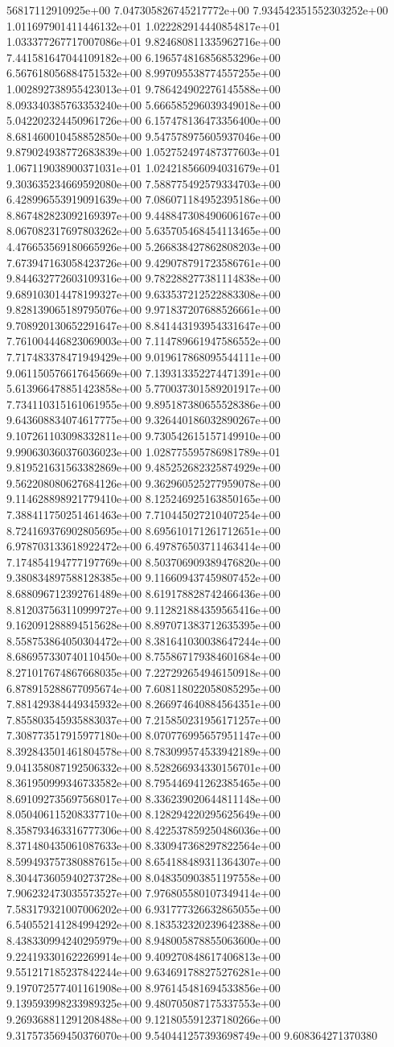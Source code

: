 56817112910925e+00	7.047305826745217772e+00	7.934542351552303252e+00	1.011697901411446132e+01	1.022282914440854817e+01	1.033377267717007086e+01	9.824680811335962716e+00	7.441581647044109182e+00	6.196574816856853296e+00	6.567618056884751532e+00	8.997095538774557255e+00	1.002892738955423013e+01	9.786424902276145588e+00	8.093340385763353240e+00	5.666585296039349018e+00	5.042202324450961726e+00	6.157478136473356400e+00	8.681460010458852850e+00	9.547578975605937046e+00	9.879024938772683839e+00	1.052752497487377603e+01	1.067119038900371031e+01	1.024218566094031679e+01	9.303635234669592080e+00	7.588775492579334703e+00	6.428996553919091639e+00	7.086071184952395186e+00	8.867482823092169397e+00	9.448847308490606167e+00	8.067082317697803262e+00	5.635705468454113465e+00	4.476653569180665926e+00	5.266838427862808203e+00	7.673947163058423726e+00	9.429078791723586761e+00	9.844632772603109316e+00	9.782288277381114838e+00	9.689103014478199327e+00	9.633537212522883308e+00	9.828139065189795076e+00	9.971837207688526661e+00	9.708920130652291647e+00	8.841443193954331647e+00	7.761004446823069003e+00	7.114789661947586552e+00	7.717483378471949429e+00	9.019617868095544111e+00	9.061150576617645669e+00	7.139313352274471391e+00	5.613966478851423858e+00	5.770037301589201917e+00	7.734110315161061955e+00	9.895187380655528386e+00	9.643608834074617775e+00	9.326440186032890267e+00	9.107261103098332811e+00	9.730542615157149910e+00	9.990630360376036023e+00	1.028775595786981789e+01	9.819521631563382869e+00	9.485252682325874929e+00	9.562208080627684126e+00	9.362960525277959078e+00	9.114628898921779410e+00	8.125246925163850165e+00	7.388411750251461463e+00	7.710445027210407254e+00	8.724169376902805695e+00	8.695610171261712651e+00	6.978703133618922472e+00	6.497876503711463414e+00	7.174854194777197769e+00	8.503706909389476820e+00	9.380834897588128385e+00	9.116609437459807452e+00	8.688096712392761489e+00	8.619178828742466436e+00	8.812037563110999727e+00	9.112821884359565416e+00	9.162091288894515628e+00	8.897071383712635395e+00	8.558753864050304472e+00	8.381641030038647244e+00	8.686957330740110450e+00	8.755867179384601684e+00	8.271017674867668035e+00	7.227292654946150918e+00	6.878915288677095674e+00	7.608118022058085295e+00	7.881429384449345932e+00	8.266974640884564351e+00	7.855803545935883037e+00	7.215850231956171257e+00	7.308773517915977180e+00	8.070776995657951147e+00	8.392843501461804578e+00	8.783099574533942189e+00	9.041358087192506332e+00	8.528266934330156701e+00	8.361950999346733582e+00	8.795446941262385465e+00	8.691092735697568017e+00	8.336239020644811148e+00	8.050406115208337710e+00	8.128294220295625649e+00	8.358793463316777306e+00	8.422537859250486036e+00	8.371480435061087633e+00	8.330947368297822564e+00	8.599493757380887615e+00	8.654188489311364307e+00	8.304473605940273728e+00	8.048350903851197558e+00	7.906232473035573527e+00	7.976805580107349414e+00	7.583179321007006202e+00	6.931777326632865055e+00	6.540552141284994292e+00	8.183532320239642388e+00	8.438330994240295979e+00	8.948005878855063600e+00	9.224193301622269914e+00	9.409270848617406813e+00	9.551217185237842244e+00	9.634691788275276281e+00	9.197072577401161908e+00	8.976145481694533856e+00	9.139593998233989325e+00	9.480705087175337553e+00	9.269368811291208488e+00	9.121805591237180266e+00	9.317573569450376070e+00	9.540441257393698749e+00	9.608364271370380